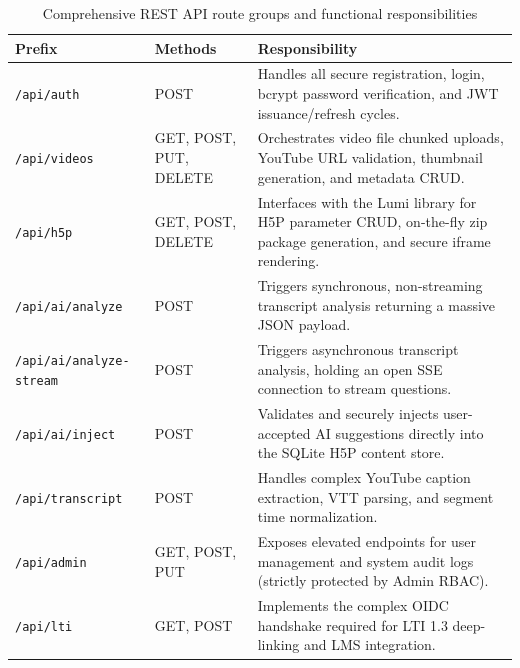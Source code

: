 \begin{table}[H]
  \centering
  \begin{tabularx}{\linewidth}{
    >{\raggedright\arraybackslash}p{3.2cm} %
    >{\raggedright\arraybackslash}p{2cm}   %
    X                                      %
  }
    \toprule
    \textbf{Prefix} & \textbf{Methods} & \textbf{Responsibility} \\
    \midrule
    \texttt{/api/auth} & POST & Handles all secure registration, login, bcrypt password verification, and JWT issuance/refresh cycles. \\
    \addlinespace
    \texttt{/api/videos} & GET, POST, PUT, DELETE & Orchestrates video file chunked uploads, YouTube URL validation, thumbnail generation, and metadata CRUD. \\
    \addlinespace
    \texttt{/api/h5p} & GET, POST, DELETE & Interfaces with the Lumi library for H5P parameter CRUD, on-the-fly zip package generation, and secure iframe rendering. \\
    \addlinespace
    \texttt{/api/ai/analyze} & POST & Triggers synchronous, non-streaming transcript analysis returning a massive JSON payload. \\
    \addlinespace
    \texttt{/api/ai/analyze- stream} & POST & Triggers asynchronous transcript analysis, holding an open SSE connection to stream questions. \\
    \addlinespace
    \texttt{/api/ai/inject} & POST & Validates and securely injects user-accepted AI suggestions directly into the SQLite H5P content store. \\
    \addlinespace
    \texttt{/api/transcript} & POST & Handles complex YouTube caption extraction, VTT parsing, and segment time normalization. \\
    \addlinespace
    \texttt{/api/admin} & GET, POST, PUT & Exposes elevated endpoints for user management and system audit logs (strictly protected by Admin RBAC). \\
    \addlinespace
    \texttt{/api/lti} & GET, POST & Implements the complex OIDC handshake required for LTI 1.3 deep-linking and LMS integration. \\
    \bottomrule
  \end{tabularx}
   \small
  \caption{Comprehensive REST API route groups and functional responsibilities}
  \label{tab:api_routes}
\end{table}

